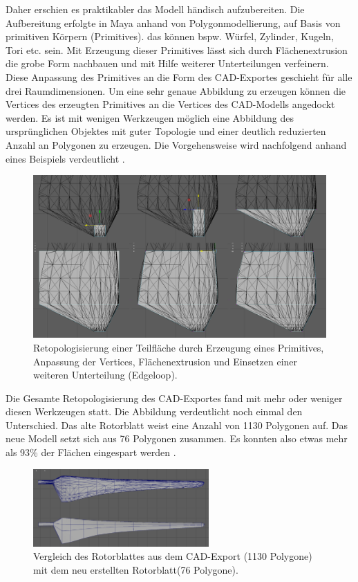 Daher erschien es praktikabler das Modell händisch aufzubereiten. Die Aufbereitung erfolgte in Maya anhand von Polygonmodellierung, auf Basis von primitiven Körpern (Primitives). das können bspw. Würfel, Zylinder, Kugeln, Tori etc. sein.  Mit Erzeugung dieser Primitives lässt sich durch Flächenextrusion die grobe Form nachbauen und mit Hilfe weiterer Unterteilungen verfeinern. Diese Anpassung des Primitives an die Form des CAD-Exportes geschieht für alle drei Raumdimensionen. Um eine sehr genaue Abbildung zu erzeugen können die Vertices des erzeugten Primitives an die Vertices des CAD-Modells \glqq angedockt\grqq\, werden. Es ist mit wenigen Werkzeugen möglich eine Abbildung des ursprünglichen Objektes mit guter Topologie und einer deutlich reduzierten Anzahl an Polygonen zu erzeugen. Die Vorgehensweise wird nachfolgend anhand eines Beispiels verdeutlicht .

\begin{figure}[H]
	\centering
	\captionsetup{width=1\textwidth}
	\includegraphics[keepaspectratio, width=1\textwidth]{bildquellen/mod}
	\caption{Retopologisierung einer Teilfläche durch Erzeugung eines Primitives, Anpassung der Vertices, Flächenextrusion und Einsetzen einer weiteren Unterteilung (Edgeloop).}
	\label{fig:2.5}
\end{figure}

Die Gesamte Retopologisierung des CAD-Exportes fand mit mehr oder weniger diesen Werkzeugen statt. Die Abbildung verdeutlicht noch einmal den Unterschied. Das alte Rotorblatt weist eine Anzahl von 1130 Polygonen auf. Das neue Modell setzt sich aus 76 Polygonen zusammen. Es konnten also etwas mehr als 93\% der Flächen eingespart werden . 

\begin{figure}[H]
	\centering
	\captionsetup{width=0.6\textwidth}
	\includegraphics[keepaspectratio, width=0.6\textwidth]{bildquellen/rotorblattGeo}
	\caption{Vergleich des Rotorblattes aus dem CAD-Export (1130 Polygone) mit dem neu erstellten Rotorblatt(76 Polygone).}
	\label{fig:2.6}
\end{figure}

